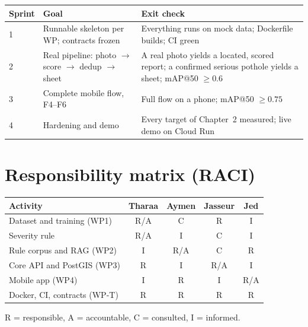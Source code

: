 \documentclass[11pt,a4paper,oneside]{report}
\begin{document}
\begin{longtable}{@{}L{1.4cm}L{5cm}L{7.6cm}@{}}
\toprule\textbf{Sprint} & \textbf{Goal} & \textbf{Exit check}\\\midrule{} & Runnable skeleton per WP; contracts frozen & Everything runs on mock data; Dockerfile builds; CI green\\
2 & Real pipeline: photo $\rightarrow$ score $\rightarrow$ dedup $\rightarrow$ sheet & A real photo yields a located, scored report; a confirmed serious pothole yields a sheet; mAP@50 $\geq0.6$\\
3 & Complete mobile flow, F4--F6 & Full flow on a phone; mAP@50 $\geq0.75$\\
4 & Hardening and demo & Every target of Chapter~2 measured; live demo on Cloud Run\\\bottomrule
\end{longtable}

\section{Responsibility matrix (RACI)}
\begin{tabular}{@{}lcccc@{}}\toprule Activity & Tharaa & Aymen & Jasseur & Jed\\\midrule
Dataset and training (WP1) & R/A & C & R & I\\
Severity rule & R/A & I & C & I\\
Rule corpus and RAG (WP2) & I & R/A & C & R\\
Core API and PostGIS (WP3) & R & I & R/A & I\\
Mobile app (WP4) & I & R & I & R/A\\
Docker, CI, contracts (WP-T) & R & R & R & R\\\bottomrule\end{tabular}

R = responsible, A = accountable, C = consulted, I = informed.

\end{document}
